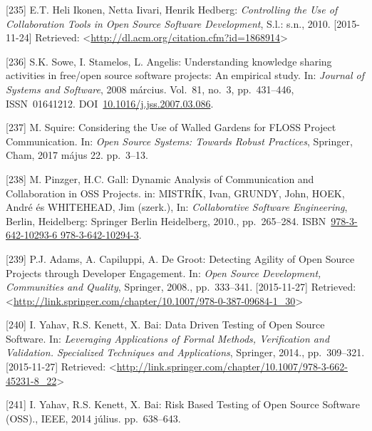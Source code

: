 \documentclass[12pt,magyar,a4paper,oneside]{scrreprt}
\newenvironment{cslreferences}%
  {}%
  {\par}
\begin{document}
\begin{cslreferences}
\leavevmode\hypertarget{ref-heli_ikonen_controlling_2010}{}%
{[}235{]} E.T. Heli Ikonen, Netta Iivari, Henrik Hedberg:
\emph{Controlling the Use of Collaboration Tools in Open Source Software
Development}, S.l.: s.n., 2010. {[}2015-11-24{]} Retrieved:
\textless{}\url{http://dl.acm.org/citation.cfm?id=1868914}\textgreater{}

\leavevmode\hypertarget{ref-sowe_understanding_2008}{}%
{[}236{]} S.K. Sowe, I. Stamelos, L. Angelis: Understanding knowledge
sharing activities in free/open source software projects: An empirical
study. In: \emph{Journal of Systems and Software}, 2008 március.
Vol.~81, no.~3, pp.~431--446, ISSN~01641212.
DOI~\href{https://doi.org/10.1016/j.jss.2007.03.086}{10.1016/j.jss.2007.03.086}.

\leavevmode\hypertarget{ref-squire_considering_2017}{}%
{[}237{]} M. Squire: Considering the Use of Walled Gardens for FLOSS
Project Communication. In: \emph{Open Source Systems: Towards Robust
Practices}, Springer, Cham, 2017 május 22. pp.~3--13.

\leavevmode\hypertarget{ref-mistrik_dynamic_2010}{}%
{[}238{]} M. Pinzger, H.C. Gall: Dynamic Analysis of Communication and
Collaboration in OSS Projects. in: MISTRÍK, Ivan, GRUNDY, John, HOEK,
André és WHITEHEAD, Jim (szerk.), In: \emph{Collaborative Software
Engineering}, Berlin, Heidelberg: Springer Berlin Heidelberg, 2010.,
pp.~265--284.
ISBN~\href{https://worldcat.org/isbn/978-3-642-10293-6\%20978-3-642-10294-3}{978-3-642-10293-6 978-3-642-10294-3}.

\leavevmode\hypertarget{ref-adams_detecting_2008}{}%
{[}239{]} P.J. Adams, A. Capiluppi, A. De Groot: Detecting Agility of
Open Source Projects through Developer Engagement. In: \emph{Open Source
Development, Communities and Quality}, Springer, 2008., pp.~333--341.
{[}2015-11-27{]} Retrieved:
\textless{}\url{http://link.springer.com/chapter/10.1007/978-0-387-09684-1_30}\textgreater{}

\leavevmode\hypertarget{ref-yahav_data_2014}{}%
{[}240{]} I. Yahav, R.S. Kenett, X. Bai: Data Driven Testing of Open
Source Software. In: \emph{Leveraging Applications of Formal Methods,
Verification and Validation. Specialized Techniques and Applications},
Springer, 2014., pp.~309--321. {[}2015-11-27{]} Retrieved:
\textless{}\url{http://link.springer.com/chapter/10.1007/978-3-662-45231-8_22}\textgreater{}

\leavevmode\hypertarget{ref-yahav_risk_2014}{}%
{[}241{]} I. Yahav, R.S. Kenett, X. Bai: Risk Based Testing of Open
Source Software (OSS)., IEEE, 2014 július. pp.~638--643.


\end{cslreferences}
\end{document}
